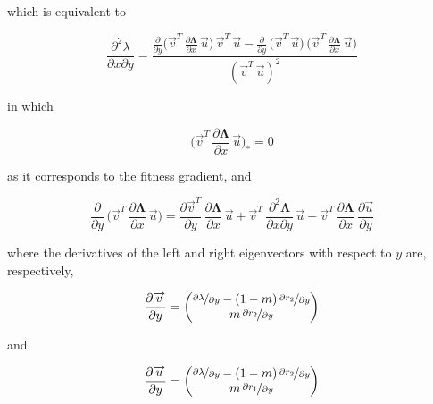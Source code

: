 which is equivalent to

\begin{equation}
    \frac{\partial^2 \lambda}{\partial x \partial y} = \frac{\frac{\partial}{\partial y}\Big(\overrightarrow{v}^T\,\frac{\partial \pmb \Lambda}{\partial x}\,\overrightarrow{u}\Big)\,\overrightarrow{v}^T\,\overrightarrow{u}-\frac{\partial}{\partial y}\,\Big(\overrightarrow{v}^T\,\overrightarrow{u}\Big)\,\Big(\overrightarrow{v}^T\,\frac{\partial \pmb \Lambda}{\partial x}\,\overrightarrow{u}\Big)}{(\overrightarrow{v}^T\,\overrightarrow{u})^2}
\end{equation}

in which

\begin{equation}
    \bigg(\overrightarrow{v}^T\,\frac{\partial \pmb \Lambda}{\partial x}\,\overrightarrow{u}\bigg)_* = 0
\end{equation}

as it corresponds to the fitness gradient, and

\begin{equation}
    \frac{\partial}{\partial y}\,\bigg(\overrightarrow{v}^T\,\frac{\partial \pmb \Lambda}{\partial x}\,\overrightarrow{u}\bigg) = \frac{\partial \overrightarrow{v}^T}{\partial y}\,\frac{\partial \pmb \Lambda}{\partial x}\,\overrightarrow{u}+\overrightarrow{v}^T\,\frac{\partial^2 \pmb \Lambda}{\partial x \partial y}\,\overrightarrow{u}+\overrightarrow{v}^T\,\frac{\partial \pmb \Lambda}{\partial x}\,\frac{\partial \overrightarrow{u}}{\partial y}   
    \label{eq:deriv_lambda_x_y}
\end{equation}

where the derivatives of the left and right eigenvectors with respect to $y$ are, respectively,

\begin{equation}
    \frac{\partial \overrightarrow{v}}{\partial y} =
    \begin{pmatrix}
        \nicefrac{\partial \lambda}{\partial y} - (1-m)\,\nicefrac{\partial r_2}{\partial y}\\
        m \,\nicefrac{\partial r_2}{\partial y}
    \end{pmatrix}
\end{equation}

and

\begin{equation}
    \frac{\partial \overrightarrow{u}}{\partial y} =
    \begin{pmatrix}
        \nicefrac{\partial \lambda}{\partial y} - (1-m)\,\nicefrac{\partial r_2}{\partial y}\\
        m \,\nicefrac{\partial r_1}{\partial y}
    \end{pmatrix}
\end{equation}

